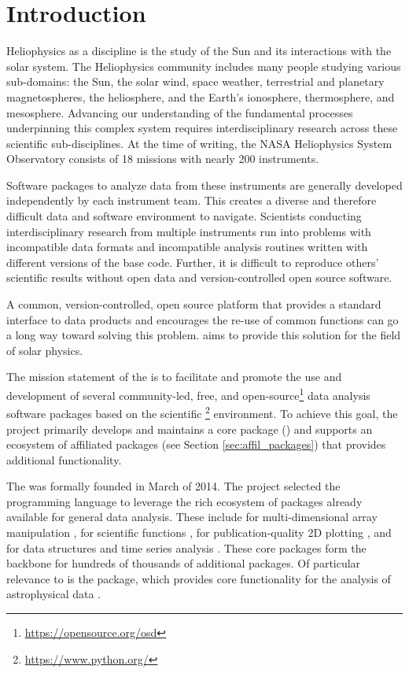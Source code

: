 \section{Introduction}
\label{sec:intro}

Heliophysics as a discipline is the study of the Sun and its interactions with the solar system.
The Heliophysics community includes many people studying various sub-domains: the Sun, the solar wind, space weather, terrestrial and planetary magnetospheres, the heliosphere, and the Earth's ionosphere, thermosphere, and mesosphere.
Advancing our understanding of the fundamental processes underpinning this complex system requires interdisciplinary research across these scientific sub-disciplines.
At the time of writing, the NASA Heliophysics System Observatory consists of 18 missions with nearly 200 instruments.

Software packages to analyze data from these instruments are generally developed independently by each instrument team.
This creates a diverse and therefore difficult data and software environment to navigate.
Scientists conducting interdisciplinary research from multiple instruments run into problems with incompatible data formats and incompatible analysis routines written with different versions of the base code. Further, it is difficult to reproduce others' scientific results without open data and version-controlled open source software.

A common, version-controlled, open source platform that provides a standard interface to data products and encourages the re-use of common functions can go a long way toward solving this problem.
\sunpy aims to provide this solution for the field of solar physics.

The mission statement of the \sunpyproj is to facilitate and promote the use and development of several community-led, free, and open-source\footnote{\url{https://opensource.org/osd}} data analysis software packages based on the scientific \python\footnote{\url{https://www.python.org/}} environment.
To achieve this goal, the project primarily develops and maintains a core package (\sunpypkg) and supports an ecosystem of affiliated packages (see Section \ref{sec:affil_packages}) that provides additional functionality.

The \sunpyproj was formally founded in March of 2014.
The project selected the \python programming language to leverage the rich ecosystem of packages already available for general data analysis.
These include  for multi-dimensional array manipulation \citep{numpy},  for scientific functions \citep{scipy},  for publication-quality 2D plotting \citep{matplotlib}, and  for data structures and time series analysis \citep{pandas}.
These core packages form the backbone for hundreds of thousands of additional \python packages.
Of particular relevance to \sunpypkg is the \astropypkg package, which provides core functionality for the analysis of astrophysical data \citep{astropy2018}.

